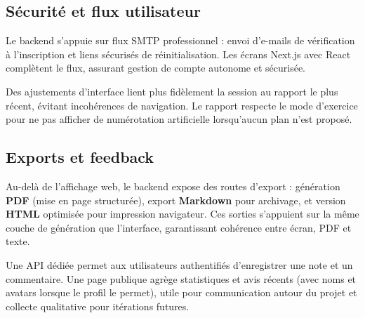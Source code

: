 ﻿\documentclass[12pt,a4paper]{article}
\begin{document}
\subsection{Sécurité et flux utilisateur}
Le backend s'appuie sur flux SMTP professionnel : envoi d'e-mails de vérification à l'inscription et liens sécurisés de réinitialisation. Les écrans Next.js \cite{nextjs} avec React \cite{react} complètent le flux, assurant gestion de compte autonome et sécurisée.

Des ajustements d'interface lient plus fidèlement la session au rapport le plus récent, évitant incohérences de navigation. Le rapport respecte le mode d'exercice pour ne pas afficher de numérotation artificielle lorsqu'aucun plan n'est proposé.

\subsection{Exports et feedback}
Au-delà de l'affichage web, le backend expose des routes d'export : génération \textbf{PDF} (mise en page structurée), export \textbf{Markdown} pour archivage, et version \textbf{HTML} optimisée pour impression navigateur. Ces sorties s'appuient sur la même couche de génération que l'interface, garantissant cohérence entre écran, PDF et texte.

Une API dédiée permet aux utilisateurs authentifiés d'enregistrer une note et un commentaire. Une page publique agrège statistiques et avis récents (avec noms et avatars lorsque le profil le permet), utile pour communication autour du projet et collecte qualitative pour itérations futures.
\end{document}
